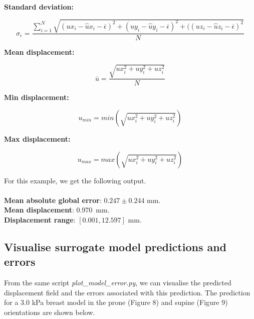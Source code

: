 \documentclass[11pt]{article}
\begin{document}
\textbf{Standard deviation: }
\begin{itemize}
    \begin{equation}
         \sigma_{\epsilon} = \frac{\sum_{i=1}^{N}\sqrt{(ux_{i} - \hat{u}x_{i} - \overline{\epsilon})^2 + (uy_{i} - \hat{u}y_{i} - \overline{\epsilon})^2 + ((uz_{i} -\hat{u}z_{i} - \overline{\epsilon})^2}}{N}
    \end{equation}
\end{itemize}

\textbf{Mean displacement: }
\begin{itemize}
    \begin{equation}
        \overline{u} = \frac{\sqrt{ux_{i}^2 + uy_{i}^2 + uz_{i}^2}}{N}
    \end{equation}
\end{itemize}

\textbf{Min displacement: }
\begin{itemize}
    \begin{equation}
        u_{min} = min(\sqrt{ux_{i}^2 + uy_{i}^2 + uz_{i}^2})    
    \end{equation}
\end{itemize}

\textbf{Max displacement: }
\begin{itemize}
    \begin{equation}
        u_{max} = max(\sqrt{ux_{i}^2 + uy_{i}^2 + uz_{i}^2})    
    \end{equation}
\end{itemize}

For this example, we get the following output. \\
\\
\textbf{Mean absolute global error}: $0.247 \pm 0.244$ mm. \\
\textbf{Mean displacement}: \SI{0.970}{mm}. \\
\textbf{Displacement range}: $[0.001, 12.597]$ mm. 

\subsection{Visualise surrogate model predictions and errors}
From the same script \textit{plot\_model\_error.py}, we can visualise the predicted displacement field and the errors associated with this prediction. The prediction for a 3.0 kPa breast model in the prone (Figure 8) and supine (Figure 9) orientations are shown below. 
\end{document}
